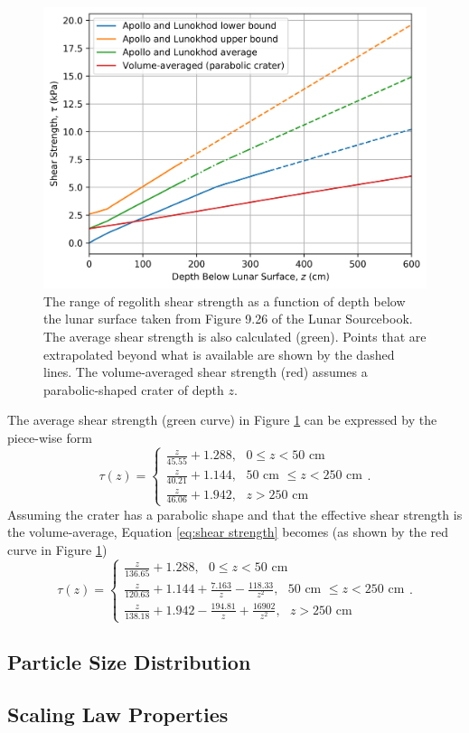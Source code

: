 \documentclass{article}
\begin{document}
\begin{figure}[!htb]
	\centering
	\includegraphics[width=\linewidth]{shear_strength_vs_depth.png}
	\caption{The range of regolith shear strength as a function of depth below the lunar surface taken from Figure 9.26 of the Lunar Sourcebook. The average shear strength is also calculated (green). Points that are extrapolated beyond what is available are shown by the dashed lines. The volume-averaged shear strength (red) assumes a parabolic-shaped crater of depth $z$.}
	\label{fig:shear_strength_vs_depth}
\end{figure}

The average shear strength (green curve) in Figure \ref{fig:shear_strength_vs_depth} can be expressed by the piece-wise form
\begin{equation}\label{eq:shear strength}
\tau(z) =
\begin{cases}
\frac{z}{45.55} + 1.288,\text{   $0 \le z < 50$ cm}\\
\frac{z}{40.21} + 1.144,\text{   $50$ cm $\le z < 250$ cm}\\
\frac{z}{46.06} + 1.942,\text{   $z > 250$ cm}
\end{cases}.
\end{equation}
Assuming the crater has a parabolic shape and that the effective shear strength is the volume-average, Equation \eqref{eq:shear strength} becomes (as shown by the red curve in Figure \ref{fig:shear_strength_vs_depth})
\begin{equation}\label{eq:shear strength_avg_para}
\tau(z) =
\begin{cases}
\frac{z}{136.65} + 1.288,\text{   $0 \le z < 50$ cm}\\
\frac{z}{120.63} + 1.144 + \frac{7.163}{z} - \frac{118.33}{z^2},\text{   $50$ cm $\le z < 250$ cm}\\
\frac{z}{138.18} + 1.942 - \frac{194.81}{z} + \frac{16902}{z^2},\text{   $z > 250$ cm}
\end{cases}.
\end{equation}



\subsection{Particle Size Distribution}


\subsection{Scaling Law Properties}
\end{document}
